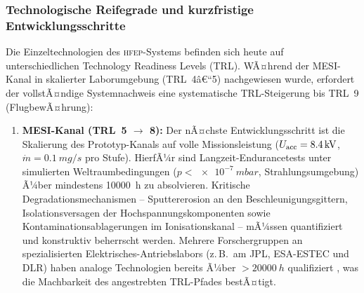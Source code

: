﻿\documentclass[a4paper,12pt,twoside]{article}
\theoremstyle{plain}
\theoremstyle{definition}
\theoremstyle{remark}
\newcommand{\mdot}{\dot{m}}
\newcommand{\HFEP}{\textsc{hfep}}
\begin{document}
	\subsubsection{Technologische Reifegrade und kurzfristige Entwicklungsschritte}

	Die Einzeltechnologien des \HFEP-Systems befinden sich heute auf unterschiedlichen
	Technology Readiness Levels (TRL). WÃ¤hrend der MESI-Kanal in skalierter
	Laborumgebung (TRL~4â€“5) nachgewiesen wurde, erfordert der vollstÃ¤ndige
	Systemnachweis eine systematische TRL-Steigerung bis TRL~9 (FlugbewÃ¤hrung):

	\begin{enumerate}
		\item \textbf{MESI-Kanal (TRL~5 $\to$ 8):}
		Der nÃ¤chste Entwicklungsschritt ist die Skalierung des Prototyp-Kanals auf
		volle Missionsleistung ($U_{\rm acc} = \SI{8.4}{kV}$, $\mdot = \SI{0.1}{mg/s}$
		pro Stufe). HierfÃ¼r sind Langzeit-Endurancetests unter simulierten
		Weltraumbedingungen ($p < \SI{e-7}{mbar}$, Strahlungsumgebung) Ã¼ber mindestens
		\SI{10000}{h} zu absolvieren. Kritische Degradationsmechanismen -- Sputtererosion
		an den Beschleunigungsgittern, Isolation\-sversagen der Hochspannungskomponenten
		sowie Kontaminationsablagerungen im Ionisationskanal -- mÃ¼ssen quantifiziert und
		konstruktiv beherrscht werden. Mehrere Forschergruppen an spezialisierten
		Elektrisches-Antriebslabors (z.\,B.\ am JPL, ESA-ESTEC und DLR) haben analoge
		Technologien bereits Ã¼ber $>\SI{20000}{h}$ qualifiziert \cite{polk1999, goebel2008},
		was die Machbarkeit des angestrebten TRL-Pfades bestÃ¤tigt.


\end{enumerate}
\end{document}
